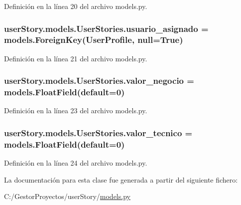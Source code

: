 Definición en la línea 20 del archivo models.\+py.

\subsubsection[{\texorpdfstring{usuario\+\_\+asignado}{usuario_asignado}}]{\setlength{\rightskip}{0pt plus 5cm}user\+Story.\+models.\+User\+Stories.\+usuario\+\_\+asignado = models.\+Foreign\+Key({\bf User\+Profile}, null=True)\hspace{0.3cm}{\ttfamily [static]}}\hypertarget{classuser_story_1_1models_1_1_user_stories_a0ee6ed978e6d77c2b8fb929088734cd5}{}\label{classuser_story_1_1models_1_1_user_stories_a0ee6ed978e6d77c2b8fb929088734cd5}


Definición en la línea 21 del archivo models.\+py.

\subsubsection[{\texorpdfstring{valor\+\_\+negocio}{valor_negocio}}]{\setlength{\rightskip}{0pt plus 5cm}user\+Story.\+models.\+User\+Stories.\+valor\+\_\+negocio = models.\+Float\+Field(default=0)\hspace{0.3cm}{\ttfamily [static]}}\hypertarget{classuser_story_1_1models_1_1_user_stories_a5747a9e05af6584278875d718c650c88}{}\label{classuser_story_1_1models_1_1_user_stories_a5747a9e05af6584278875d718c650c88}


Definición en la línea 23 del archivo models.\+py.

\subsubsection[{\texorpdfstring{valor\+\_\+tecnico}{valor_tecnico}}]{\setlength{\rightskip}{0pt plus 5cm}user\+Story.\+models.\+User\+Stories.\+valor\+\_\+tecnico = models.\+Float\+Field(default=0)\hspace{0.3cm}{\ttfamily [static]}}\hypertarget{classuser_story_1_1models_1_1_user_stories_a063c3ed2939ba157b573b974347bab49}{}\label{classuser_story_1_1models_1_1_user_stories_a063c3ed2939ba157b573b974347bab49}


Definición en la línea 24 del archivo models.\+py.



La documentación para esta clase fue generada a partir del siguiente fichero\+:\begin{DoxyCompactItemize}
\item 
C\+:/\+Gestor\+Proyectos/user\+Story/\hyperlink{user_story_2models_8py}{models.\+py}\end{DoxyCompactItemize}
